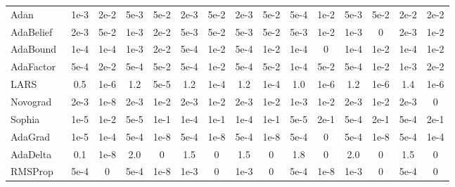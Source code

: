 \begin{table*}[ht]
{\begin{tabular}{l|cccccccccccccc}
\rowcolor[HTML]{D1F5FF} Adan~\cite{tpami2023adan} & 1e-3 & 2e-2 & 5e-3 & 5e-2 & 2e-3 & 5e-2 & 2e-3 & 5e-2 & 5e-4 & 1e-2 & 5e-3 & 5e-2 & 2e-2 & 2e-2 \\
\rowcolor[HTML]{DCF0E2} AdaBelief~\cite{nips2019adabelief} & 2e-3 & 5e-2 & 1e-3 & 2e-2 & 5e-3 & 5e-2 & 5e-3 & 5e-2 & 5e-3 & 1e-2 & 1e-3 & 0 & 2e-3 & 1e-2 \\
\rowcolor[HTML]{DCF0E2} AdaBound~\cite{iclr2019adabound} & 1e-4 & 1e-4 & 1e-3 & 2e-2 & 5e-4 & 1e-2 & 5e-4 & 1e-2 & 1e-4 & 0 & 1e-4 & 1e-2 & 1e-4 & 1e-2 \\
\rowcolor[HTML]{DCF0E2} AdaFactor~\cite{icml2018adafactor} & 5e-4 & 2e-2 & 5e-4 & 5e-2 & 5e-4 & 1e-2 & 5e-4 & 5e-2 & 1e-4 & 5e-2 & 5e-4 & 1e-2 & 1e-3 & 2e-2 \\
\rowcolor[HTML]{DCF0E2} LARS~\cite{iclr2018lars} & 0.5 & 1e-6 & 1.2 & 5e-5 & 1.2 & 1e-4 & 1.2 & 1e-4 & 1.0 & 1e-6 & 1.2 & 1e-6 & 1.4 & 1e-6 \\
\rowcolor[HTML]{DCF0E2} Novograd~\cite{arxiv2020Novograd} & 2e-3 & 1e-8 & 2e-3 & 1e-2 & 2e-3 & 1e-2 & 2e-3 & 1e-2 & 1e-3 & 1e-2 & 2e-3 & 1e-2 & 2e-3 & 0 \\
\rowcolor[HTML]{DCF0E2} Sophia~\cite{liu2023sophia} & 1e-5 & 1e-2 & 5e-5 & 1e-1 & 1e-4 & 1e-1 & 1e-4 & 1e-1 & 5e-5 & 2e-1 & 5e-4 & 2e-1 & 5e-4 & 2e-1 \\
\rowcolor[HTML]{DBCEE4} AdaGrad~\cite{jmlr2011adagrad} & 1e-5 & 1e-4 & 5e-4 & 1e-8 & 5e-4 & 1e-8 & 5e-4 & 1e-8 & 5e-4 & 0 & 5e-4 & 1e-8 & 5e-4 & 1e-4 \\
\rowcolor[HTML]{DBCEE4} AdaDelta~\cite{arxiv2012adadelta} & 0.1 & 1e-8 & 2.0 & 0 & 1.5 & 0 & 1.5 & 0 & 1.8 & 0 & 2.0 & 0 & 1.5 & 0 \\
\rowcolor[HTML]{DBCEE4} RMSProp~\cite{hinton2012rmsprop} & 5e-4 & 0 & 5e-4 & 1e-8 & 1e-3 & 0 & 1e-3 & 0 & 5e-4 & 1e-8 & 1e-3 & 0 & 5e-4 & 0 \\
    \bottomrule
    \end{tabular}
    }
\label{tab:app_hyper_cifar_basic}
\vspace{-0.5em}
\end{table*}


